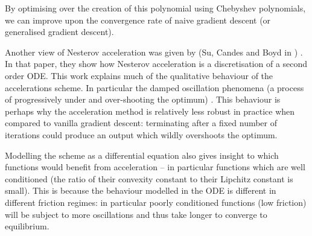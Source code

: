 By optimising over the creation of this polynomial using Chebyshev polynomials, we can improve upon the convergence rate of naive gradient descent (or generalised gradient descent). 

Another view of Nesterov acceleration was given by (Su, Candes and Boyd in \cite{su2014differential}) . In that paper, they show how Nesterov acceleration is a discretisation of a second order ODE. This work explains much of the qualitative behaviour of the accelerations scheme. In particular the damped oscillation phenomena (a process of progressively under and over-shooting the optimum) . This behaviour is perhaps why the acceleration method is relatively less robust in practice when compared to vanilla gradient descent: terminating after a fixed number of iterations could produce an output which wildly overshoots the optimum. 

Modelling the scheme as a differential equation also gives insight to which functions would benefit from acceleration – in particular functions which are well conditioned (the ratio of  their convexity constant to their Lipchitz  constant is small).  This is because the behaviour modelled in the ODE is different in different friction regimes: in particular poorly conditioned functions (low friction) will be subject to more oscillations and thus take longer to converge to equilibrium.